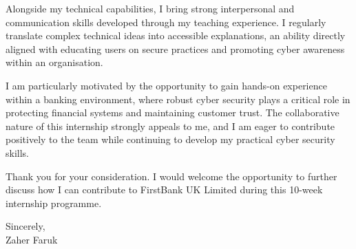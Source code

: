\documentclass[letterpaper,11pt]{article}
\begin{document}
Alongside my technical capabilities, I bring strong interpersonal and communication skills developed through my teaching experience. I regularly translate complex technical ideas into accessible explanations, an ability directly aligned with educating users on secure practices and promoting cyber awareness within an organisation.

I am particularly motivated by the opportunity to gain hands-on experience within a banking environment, where robust cyber security plays a critical role in protecting financial systems and maintaining customer trust. The collaborative nature of this internship strongly appeals to me, and I am eager to contribute positively to the team while continuing to develop my practical cyber security skills.

Thank you for your consideration. I would welcome the opportunity to further discuss how I can contribute to FirstBank UK Limited during this 10-week internship programme.

\vspace{0.5cm}

Sincerely, \\
\vspace{0.2cm}
Zaher Faruk
\end{document}
